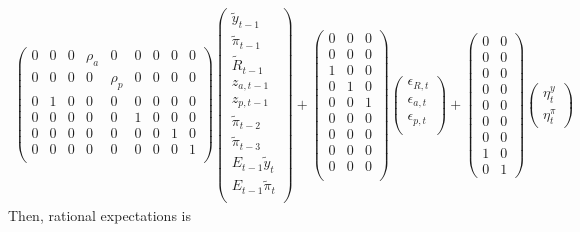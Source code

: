 \documentclass{article}
\begin{document}
\begin{CJK}{UTF8}{min}
\begin{align*}
\begin{pmatrix}
0&0&0&\rho _a&0&0&0&0&0\\
0&0&0&0&\rho_p&0&0&0&0\\
0&1&0&0&0&0&0&0&0\\
0&0&0&0&0&1&0&0&0\\
0&0&0&0&0&0&0&1&0\\
0&0&0&0&0&0&0&0&1\\
\end{pmatrix}
\begin{pmatrix}
\tilde y_{t-1}\\
\tilde \pi_{t-1}\\
\tilde R_{t-1}\\
z_{a,t-1}\\
z_{p,t-1}\\
\tilde \pi_{t-2}\\
\tilde \pi_{t-3}\\
E_{t-1}\tilde y_t\\
E_{t-1}\tilde \pi_t\\
\end{pmatrix}+
\begin{pmatrix}
0&0&0\\
0&0&0\\
1&0&0\\
0&1&0\\
0&0&1\\
0&0&0\\
0&0&0\\
0&0&0\\
0&0&0\\
\end{pmatrix}
\begin{pmatrix}
\epsilon_{R,t}\\
\epsilon_{a,t}\\
\epsilon_{p,t}\\
\end{pmatrix}+
\begin{pmatrix}
0&0\\
0&0\\
0&0\\
0&0\\
0&0\\
0&0\\
0&0\\
1&0\\
0&1
\end{pmatrix}
\begin{pmatrix}
\eta^y_t\\
\eta^\pi_t
\end{pmatrix}
\end{align*}
Then, rational expectations is\\\\

\end{CJK}
\end{document}
